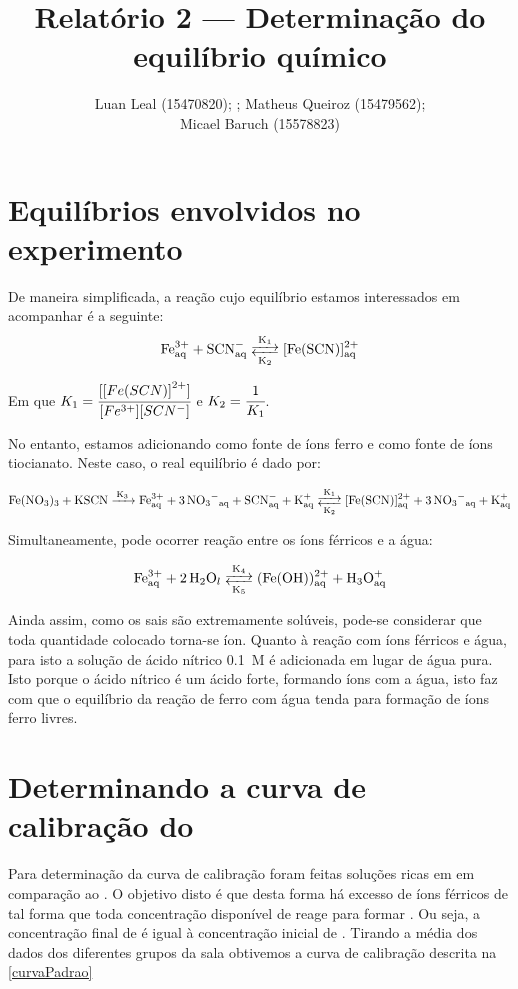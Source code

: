 \documentclass{article}
\author{Luan Leal (15470820);
; Matheus Queiroz (15479562);\\ Micael Baruch (15578823)}
\title{Relatório 2 --- Determinação do equilíbrio químico}
\begin{document}
\maketitle

\section{Equilíbrios envolvidos no experimento}

De maneira simplificada, a reação cujo equilíbrio estamos interessados em acompanhar é a seguinte:
\begin{align*}
    \ce{Fe^{3+}_{aq} + SCN^-_{aq} <-->[{K_1}][{K_2}] {[Fe(SCN)]}^{2+}_{aq}}
\end{align*}

Em que \(K_1 = \cfrac{[{[Fe(SCN)]}^{2+}]}{[Fe^{3+}][SCN^-]} \) e \(K_2 = \cfrac{1}{K_1}\).

No entanto, estamos adicionando  como fonte de íons ferro e  como fonte de íons tiocianato. Neste caso, o real equilíbrio é dado por:

\begin{align*}
    \ce{Fe(NO3)3 + KSCN ->[{K_3}] Fe^{3+}_{aq} + 3NO3^-_{aq} + SCN^-_{aq} + K^+_{aq} <-->[{K_1}][{K_2}] {[Fe(SCN)]}^{2+}_{aq} + 3NO3^-_{aq} + K^+_{aq}}
\end{align*}

Simultaneamente, pode ocorrer reação entre os íons férricos e a água:

\begin{align*}
    \ce{Fe^{3+}_{aq} + 2H2O_l <-->[{K_4}][{K_5}] {(Fe(OH))}^{2+}_{aq} + H3O^+_{aq}}
\end{align*}

Ainda assim, como os sais são extremamente solúveis, pode-se considerar que toda quantidade colocado torna-se íon. Quanto à reação com íons férricos e água, para isto a solução de ácido nítrico \qty{0,1}{M} é adicionada em lugar de água pura. Isto porque o ácido nítrico é um ácido forte, formando íons  com a água, isto faz com que o equilíbrio da reação de ferro com água tenda para formação de íons ferro livres.


\section{Determinando a curva de calibração do }
Para determinação da curva de calibração foram feitas soluções ricas em  em comparação ao . O objetivo disto é que desta forma há excesso de íons férricos de tal forma que toda concentração disponível de  reage para formar . Ou seja, a concentração final de  é igual à concentração inicial de . Tirando a média dos dados dos diferentes grupos da sala obtivemos a curva de calibração descrita na \cref{curvaPadrao}
\end{document}
